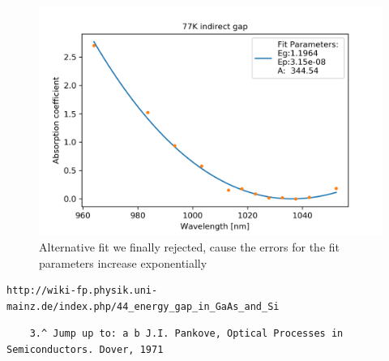 \documentclass[]{article}
\begin{document}
\begin{figure}
	\centering
	\includegraphics[width=0.7\linewidth]{"Plots/77K indirect gap alternative"}
	\caption{Alternative fit we finally rejected, cause the errors for the fit parameters increase exponentially}
	\label{fig:77k-indirect-gap-alternative}
\end{figure}

\newpage
\begin{thebibliography}{}

 \begin{verbatim}
http://wiki-fp.physik.uni-mainz.de/index.php/44_energy_gap_in_GaAs_and_Si
\end{verbatim} 
\begin{verbatim}
	3.^ Jump up to: a b J.I. Pankove, Optical Processes in Semiconductors. Dover, 1971
\end{verbatim}



\end{thebibliography}
\end{document}
